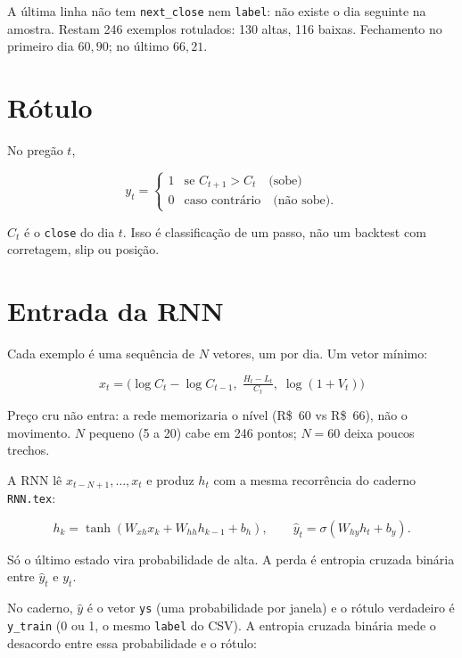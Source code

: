 \documentclass[11pt]{article}
\begin{document}
A última linha não tem \texttt{next\_close} nem \texttt{label}: não existe o dia seguinte na amostra. Restam 246 exemplos rotulados: 130 altas, 116 baixas. Fechamento no primeiro dia \(60{,}90\); no último \(66{,}21\).

\section{Rótulo}

No pregão \(t\),

\begin{equation}
  y_t =
  \begin{cases}
    1 & \text{se } C_{t+1} > C_t \quad \text{(sobe)} \\
    0 & \text{caso contrário} \quad \text{(não sobe).}
  \end{cases}
\end{equation}

\(C_t\) é o \texttt{close} do dia \(t\). Isso é classificação de um passo, não um backtest com corretagem, slip ou posição.

\section{Entrada da RNN}

Cada exemplo é uma sequência de \(N\) vetores, um por dia. Um vetor mínimo:

\begin{equation}
  x_t =
  \bigl(
    \log C_t - \log C_{t-1},\;
    \tfrac{H_t - L_t}{C_t},\;
    \log(1+V_t)
  \bigr)
\end{equation}

Preço cru não entra: a rede memorizaria o nível (R\$~60 vs R\$~66), não o movimento. \(N\) pequeno (5 a 20) cabe em 246 pontos; \(N=60\) deixa poucos trechos.

A RNN lê \(x_{t-N+1},\ldots,x_t\) e produz \(h_t\) com a mesma recorrência do caderno \texttt{RNN.tex}:

\begin{equation}
  h_k = \tanh(W_{xh} x_k + W_{hh} h_{k-1} + b_h),
  \qquad
  \hat{y}_t = \sigma(W_{hy} h_t + b_y).
\end{equation}

Só o último estado vira probabilidade de alta. A perda é entropia cruzada binária entre \(\hat{y}_t\) e \(y_t\).

No caderno, \(\hat{y}\) é o vetor \texttt{ys} (uma probabilidade por janela) e o rótulo verdadeiro é \texttt{y\_train} (0 ou 1, o mesmo \texttt{label} do CSV). A entropia cruzada binária mede o desacordo entre essa probabilidade e o rótulo:
\end{document}
